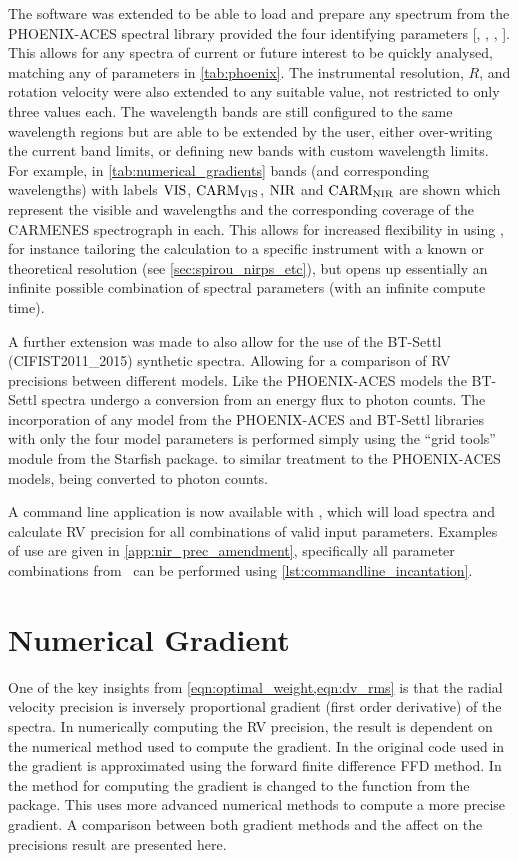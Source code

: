 The software was extended to be able to load and prepare any spectrum from the {PHOENIX-ACES} spectral library provided the four identifying parameters [\Teff, \Logg, \feh{}, \alphafe{}].
This allows for any spectra of current or future interest to be quickly analysed, matching any of parameters in \cref{tab:phoenix}.
The instrumental resolution, \(R\), and rotation velocity \Vsini{} were also extended to any suitable value, not restricted to only three values each.
The \nir{} wavelength bands are still configured to the same wavelength regions but are able to be extended by the user, either over-writing the current band limits, or defining new bands with custom wavelength limits.
For example, in \cref{tab:numerical_gradients} bands (and corresponding wavelengths) with labels \({\rm VIS}\), \(\rm {CARM}_{VIS}\), \(\rm {NIR}\) and \(\rm {CARM}_{NIR}\) are shown which represent the visible and \nir{} wavelengths and the corresponding coverage of the {CARMENES} spectrograph in each.
This allows for increased flexibility in using \eniric{}, for instance tailoring the calculation to a specific instrument with a known or theoretical resolution (see \cref{sec:spirou_nirps_etc}), but opens up essentially an infinite possible combination of spectral parameters (with an infinite compute time).

A further extension was made to also allow for the use of the {BT-Settl} ({CIFIST2011\_2015}) synthetic spectra.
Allowing for a comparison of RV precisions between different models.
Like the {PHOENIX-ACES} models the {BT-Settl} spectra undergo a conversion from an energy flux to photon counts.
The incorporation of any model from the {PHOENIX-ACES} and {BT-Settl} libraries with only the four model parameters is performed simply using the ``grid tools'' module from the Starfish package\citep{czekala_constructing_2015}.
to similar treatment to the {PHOENIX-ACES} models, being converted to photon counts.

A command line application is now available with \eniric{}, which will load spectra and calculate RV precision for all combinations of valid input parameters.
Examples of use are given in \cref{app:nir_prec_amendment}, specifically all parameter combinations from~\citep{figueira_radial_2016} can be performed using \cref{lst:commandline_incantation}.


\section{Numerical Gradient}
\label{sec:numerical_gradient}
One of the key insights from \cref{eqn:optimal_weight,eqn:dv_rms} is that the radial velocity precision is inversely proportional gradient (first order derivative) of the spectra.
In numerically computing the {RV} precision, the result is dependent on the numerical method used to compute the gradient.
In the original code used in~\citet{figueira_radial_2016} the gradient is approximated using the forward finite difference {FFD} method.
In \eniric{} the method for computing the gradient is changed to the \npgradient{} function from the \numpy{} package.
This uses more advanced numerical methods to compute a more precise gradient.
A comparison between both gradient methods and the affect on the precisions result are presented here.


